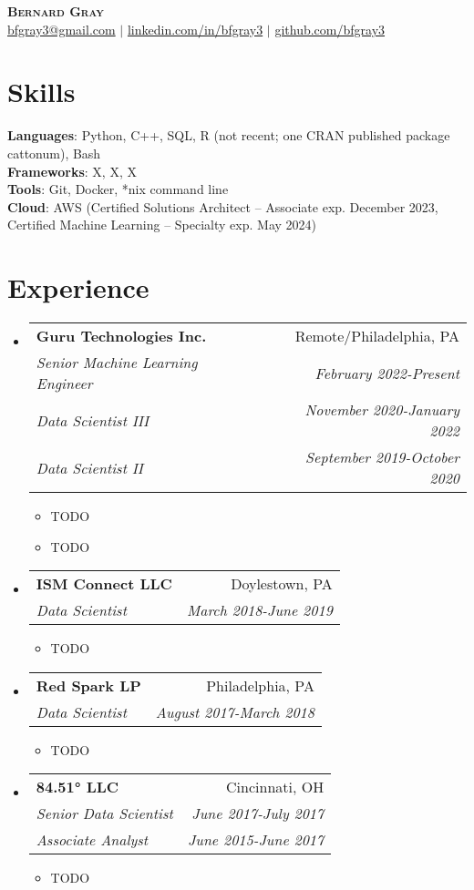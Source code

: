 \documentclass[letterpaper,11pt]{article}
\makeatletter
\newcommand{\resumeItem}[1]{
  \item\small{
    {#1 \vspace{-2pt}}
  }
}
\newcommand{\resumeSubheadingThree}[8]{
  \vspace{-2pt}\item
    \begin{tabular*}{0.97\textwidth}[t]{l@{\extracolsep{\fill}}r}
      \textbf{#1} & #2 \\
      \textit{\small#3} & \textit{\small #4} \\
      \textit{\small#5} & \textit{\small #6} \\
      \textit{\small#7} & \textit{\small #8} \\
    \end{tabular*}\vspace{-7pt}
}
\newcommand{\resumeSubheadingTwo}[6]{
  \vspace{-2pt}\item
    \begin{tabular*}{0.97\textwidth}[t]{l@{\extracolsep{\fill}}r}
      \textbf{#1} & #2 \\
      \textit{\small#3} & \textit{\small #4} \\
      \textit{\small#5} & \textit{\small #6} \\
    \end{tabular*}\vspace{-7pt}
}
\newcommand{\resumeSubheading}[4]{
  \vspace{-2pt}\item
    \begin{tabular*}{0.97\textwidth}[t]{l@{\extracolsep{\fill}}r}
      \textbf{#1} & #2 \\
      \textit{\small#3} & \textit{\small #4} \\
    \end{tabular*}\vspace{-7pt}
}
\newcommand{\resumeSubHeadingListStart}{\begin{itemize}[leftmargin=0.15in, label={}]}
\newcommand{\resumeSubHeadingListEnd}{\end{itemize}}
\newcommand{\resumeItemListStart}{\begin{itemize}}
\newcommand{\resumeItemListEnd}{\end{itemize}\vspace{-5pt}}
\makeatother
\begin{document}
\begin{center}
    \textbf{\Huge \scshape Bernard Gray} \\ \vspace{1pt}
    \href{mailto:bfgray3@gmail.com}{bfgray3@gmail.com} $|$
    \url{linkedin.com/in/bfgray3} $|$
    \url{github.com/bfgray3}
\end{center}

\section{Skills}
 \begin{itemize}[leftmargin=0.15in, label={}]
    \small{\item{
     \textbf{Languages}{: Python, C++, SQL, R (not recent; one CRAN published package cattonum), Bash} \\
     \textbf{Frameworks}{: X, X, X} \\
     \textbf{Tools}{: Git, Docker, *nix command line} \\
     \textbf{Cloud}{: AWS (Certified Solutions Architect – Associate exp. December 2023, Certified Machine Learning – Specialty exp. May 2024)}
    }}
 \end{itemize}

\section{Experience}
  \resumeSubHeadingListStart
    \resumeSubheadingThree
      {Guru Technologies Inc.}{Remote/Philadelphia, PA}
      {Senior Machine Learning Engineer}{February 2022-Present}
      {Data Scientist III}{November 2020-January 2022}
      {Data Scientist II}{September 2019-October 2020}
      \resumeItemListStart
        \resumeItem{TODO}
        \resumeItem{TODO}
      \resumeItemListEnd
      
    \resumeSubheading
      {ISM Connect LLC}{Doylestown, PA}
      {Data Scientist}{March 2018-June 2019}
      \resumeItemListStart
        \resumeItem{TODO}
      \resumeItemListEnd

    \resumeSubheading
      {Red Spark LP}{Philadelphia, PA}
      {Data Scientist}{August 2017-March 2018}
      \resumeItemListStart
        \resumeItem{TODO}
      \resumeItemListEnd

    \resumeSubheadingTwo
      {84.51° LLC}{Cincinnati, OH}
      {Senior Data Scientist}{June 2017-July 2017}
      {Associate Analyst}{June 2015-June 2017}
      \resumeItemListStart
        \resumeItem{TODO}
      \resumeItemListEnd
    \resumeSubHeadingListEnd
\end{document}
